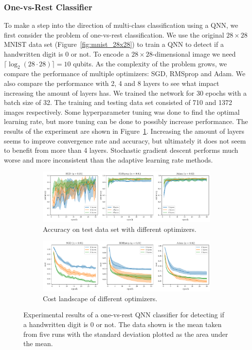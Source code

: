 \documentclass[a4paper,10pt]{article}
\begin{document}
\subsubsection{One-vs-Rest Classifier}
To make a step into the direction of multi-class classification using a QNN, we first consider the problem of one-vs-rest classification.
We use the original $28 \times 28$ MNIST data set (Figure~\ref{fig:mnist_28x28}) to train a QNN to detect if a handwritten digit is 0 or not.
To encode a $28 \times 28$-dimensional image we need $\lceil \log_2(28 \cdot 28) \rceil = 10$ qubits.
As the complexity of the problem grows, we compare the performance of multiple optimizers: SGD, RMSprop and Adam.
We also compare the performance with 2, 4 and 8 layers to see what impact increasing the amount of layers has.
We trained the network for 30 epochs with a batch size of 32.
The training and testing data set consisted of 710 and 1372 images respectively.
Some hyperparameter tuning was done to find the optimal learning rate, but more tuning can be done to possibly increase performance.
The results of the experiment are shown in Figure~\ref{fig:ovr_results}.
Increasing the amount of layers seems to improve convergence rate and accuracy, but ultimately it does not seem to benefit from more than 4 layers.
Stochastic gradient descent performs much worse and more inconsistent than the adaptive learning rate methods.

\begin{figure}[ht]
	\centering
	\begin{subfigure}{1\textwidth}
		\centering
		\includegraphics[width=1\linewidth]{figures/qnn_ovr_accuracy.pdf}
		\caption{Accuracy on test data set with different optimizers.}
		\vspace*{4mm}
	\end{subfigure}
	\begin{subfigure}{1\textwidth}
		\centering
		\includegraphics[width=1\linewidth]{figures/qnn_ovr_cost.pdf}
		\caption{Cost landscape of different optimizers.}
	\end{subfigure}
	\caption{Experimental results of a one-vs-rest QNN classifier for detecting if a handwritten digit is 0 or not. The data shown is the mean taken from five runs with the standard deviation plotted as the area under the mean.}
	\label{fig:ovr_results}
\end{figure}
\end{document}
